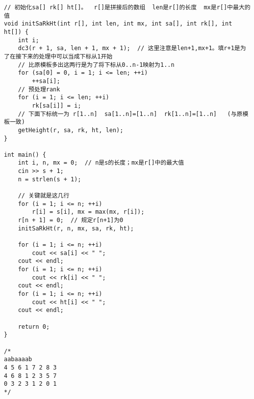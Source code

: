 \begin{lstlisting}
// 初始化sa[] rk[] ht[]。  r[]是拼接后的数组  len是r[]的长度  mx是r[]中最大的值
void initSaRkHt(int r[], int len, int mx, int sa[], int rk[], int ht[]) {
    int i;
    dc3(r + 1, sa, len + 1, mx + 1);  // 这里注意是len+1,mx+1。填r+1是为了在接下来的处理中可以当成下标从1开始
    // 比原模板多出这两行是为了将下标从0..n-1映射为1..n
    for (sa[0] = 0, i = 1; i <= len; ++i)
        ++sa[i];
    // 预处理rank
    for (i = 1; i <= len; ++i)
        rk[sa[i]] = i;
    // 下面下标统一为 r[1..n]  sa[1..n]=[1..n]  rk[1..n]=[1..n]   (与原模板一致)
    getHeight(r, sa, rk, ht, len);
}

int main() {
    int i, n, mx = 0;  // n是s的长度；mx是r[]中的最大值
    cin >> s + 1;
    n = strlen(s + 1);

    // 关键就是这几行
    for (i = 1; i <= n; ++i)
        r[i] = s[i], mx = max(mx, r[i]);
    r[n + 1] = 0;  // 规定r[n+1]为0
    initSaRkHt(r, n, mx, sa, rk, ht);

    for (i = 1; i <= n; ++i)
        cout << sa[i] << " ";
    cout << endl;
    for (i = 1; i <= n; ++i)
        cout << rk[i] << " ";
    cout << endl;
    for (i = 1; i <= n; ++i)
        cout << ht[i] << " ";
    cout << endl;

    return 0;
}

/*
aabaaaab
4 5 6 1 7 2 8 3
4 6 8 1 2 3 5 7
0 3 2 3 1 2 0 1
*/
\end{lstlisting}
